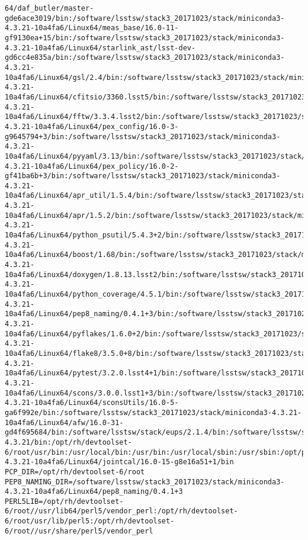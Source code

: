 \begin{verbatim}
64/daf_butler/master-gde6ace3019/bin:/software/lsstsw/stack3_20171023/stack/miniconda3-4.3.21-10a4fa6/Linux64/meas_base/16.0-11-gf9130ea+15/bin:/software/lsstsw/stack3_20171023/stack/miniconda3-4.3.21-10a4fa6/Linux64/starlink_ast/lsst-dev-gd6cc4e835a/bin:/software/lsstsw/stack3_20171023/stack/miniconda3-4.3.21-10a4fa6/Linux64/gsl/2.4/bin:/software/lsstsw/stack3_20171023/stack/miniconda3-4.3.21-10a4fa6/Linux64/cfitsio/3360.lsst5/bin:/software/lsstsw/stack3_20171023/stack/miniconda3-4.3.21-10a4fa6/Linux64/fftw/3.3.4.lsst2/bin:/software/lsstsw/stack3_20171023/stack/miniconda3-4.3.21-10a4fa6/Linux64/pex_config/16.0-3-g9645794+3/bin:/software/lsstsw/stack3_20171023/stack/miniconda3-4.3.21-10a4fa6/Linux64/pyyaml/3.13/bin:/software/lsstsw/stack3_20171023/stack/miniconda3-4.3.21-10a4fa6/Linux64/pex_policy/16.0-2-gf41ba6b+3/bin:/software/lsstsw/stack3_20171023/stack/miniconda3-4.3.21-10a4fa6/Linux64/apr_util/1.5.4/bin:/software/lsstsw/stack3_20171023/stack/miniconda3-4.3.21-10a4fa6/Linux64/apr/1.5.2/bin:/software/lsstsw/stack3_20171023/stack/miniconda3-4.3.21-10a4fa6/Linux64/python_psutil/5.4.3+2/bin:/software/lsstsw/stack3_20171023/stack/miniconda3-4.3.21-10a4fa6/Linux64/boost/1.68/bin:/software/lsstsw/stack3_20171023/stack/miniconda3-4.3.21-10a4fa6/Linux64/doxygen/1.8.13.lsst2/bin:/software/lsstsw/stack3_20171023/stack/miniconda3-4.3.21-10a4fa6/Linux64/python_coverage/4.5.1/bin:/software/lsstsw/stack3_20171023/stack/miniconda3-4.3.21-10a4fa6/Linux64/pep8_naming/0.4.1+3/bin:/software/lsstsw/stack3_20171023/stack/miniconda3-4.3.21-10a4fa6/Linux64/pyflakes/1.6.0+2/bin:/software/lsstsw/stack3_20171023/stack/miniconda3-4.3.21-10a4fa6/Linux64/flake8/3.5.0+8/bin:/software/lsstsw/stack3_20171023/stack/miniconda3-4.3.21-10a4fa6/Linux64/pytest/3.2.0.lsst4+1/bin:/software/lsstsw/stack3_20171023/stack/miniconda3-4.3.21-10a4fa6/Linux64/scons/3.0.0.lsst1+3/bin:/software/lsstsw/stack3_20171023/stack/miniconda3-4.3.21-10a4fa6/Linux64/sconsUtils/16.0-5-ga6f992e/bin:/software/lsstsw/stack3_20171023/stack/miniconda3-4.3.21-10a4fa6/Linux64/afw/16.0-31-gd4f695684/bin:/software/lsstsw/stack/eups/2.1.4/bin:/software/lsstsw/stack3_20171023/python/miniconda3-4.3.21/bin:/opt/rh/devtoolset-6/root/usr/bin:/usr/local/bin:/usr/bin:/usr/local/sbin:/usr/sbin:/opt/puppetlabs/bin:/opt/dell/srvadmin/bin:/home/$USER/.local/bin:/home/$USER/bin:/software/lsstsw/stack3_20171023/stack/miniconda3-4.3.21-10a4fa6/Linux64/jointcal/16.0-15-g8e16a51+1/bin
PCP_DIR=/opt/rh/devtoolset-6/root
PEP8_NAMING_DIR=/software/lsstsw/stack3_20171023/stack/miniconda3-4.3.21-10a4fa6/Linux64/pep8_naming/0.4.1+3
PERL5LIB=/opt/rh/devtoolset-6/root//usr/lib64/perl5/vendor_perl:/opt/rh/devtoolset-6/root/usr/lib/perl5:/opt/rh/devtoolset-6/root//usr/share/perl5/vendor_perl

\end{verbatim}
